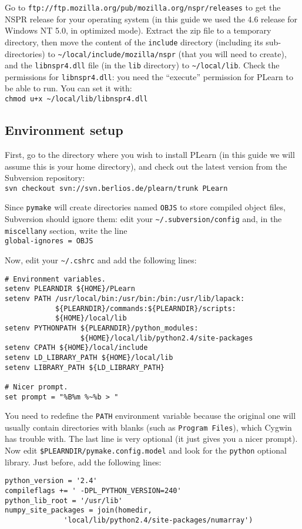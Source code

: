 \documentclass[11pt]{book}
\begin{document}
Go to \verb!ftp://ftp.mozilla.org/pub/mozilla.org/nspr/releases! to get
the NSPR release for your operating system (in this guide we used the
4.6 release for Windows NT 5.0, in optimized mode).
Extract the zip file to a temporary directory, then move the content of the
\verb!include! directory (including its sub-directories) to \verb!~/local/include/mozilla/nspr! (that you
will need to create), and the
\verb!libnspr4.dll! file (in the \verb!lib! directory) to \verb!~/local/lib!.
Check the permissions for \verb!libnspr4.dll!: you need the ``execute'' permission
for PLearn to be able to run. You can set it with:\\
\verb!chmod u+x ~/local/lib/libnspr4.dll!


\subsection{Environment setup}

First, go to the directory
where you wish to install PLearn (in this guide we will assume this is your
home directory), and check out the latest
version from the Subversion repository:\\
\verb!svn checkout svn://svn.berlios.de/plearn/trunk PLearn!

Since \verb!pymake! will create directories named \verb!OBJS! to store
compiled object files, Subversion should ignore them: edit
your \verb!~/.subversion/config! and, in the \verb!miscellany! section,
write the line\\
\verb!global-ignores = OBJS!

Now, edit your \verb!~/.cshrc! and add the following lines:

\begin{verbatim}
# Environment variables.
setenv PLEARNDIR ${HOME}/PLearn
setenv PATH /usr/local/bin:/usr/bin:/bin:/usr/lib/lapack:
            ${PLEARNDIR}/commands:${PLEARNDIR}/scripts:
            ${HOME}/local/lib
setenv PYTHONPATH ${PLEARNDIR}/python_modules:
                  ${HOME}/local/lib/python2.4/site-packages
setenv CPATH ${HOME}/local/include
setenv LD_LIBRARY_PATH ${HOME}/local/lib
setenv LIBRARY_PATH ${LD_LIBRARY_PATH}

# Nicer prompt.
set prompt = "%B%m %~%b > "
\end{verbatim}

You need to redefine the \verb!PATH! environment variable because the
original one will usually contain directories with blanks (such as
\verb!Program Files!), which Cygwin has trouble with.
The last line is very optional (it just gives you a nicer prompt).
Now edit \verb!$PLEARNDIR/pymake.config.model! and look for the
\verb!python! optional library.
Just before, add the following lines:
\begin{verbatim}
python_version = '2.4'
compileflags += ' -DPL_PYTHON_VERSION=240'
python_lib_root = '/usr/lib'
numpy_site_packages = join(homedir,
              'local/lib/python2.4/site-packages/numarray')
\end{verbatim}
\end{document}
